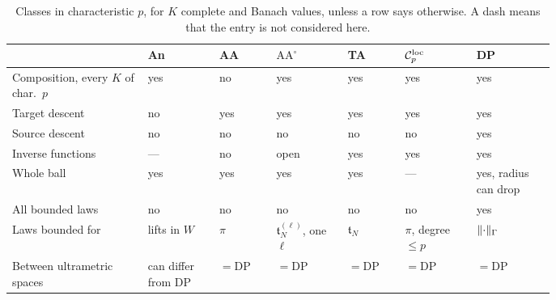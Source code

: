 \begin{table}[htbp]
\small
\caption{Classes in characteristic $p$, for $K$ complete and Banach values, unless a row says otherwise. A dash means that the entry is not considered here.}\label{dp:tab:classes}
\begin{tabular}{@{}p{0.19\linewidth}p{0.1\linewidth}p{0.085\linewidth}p{0.105\linewidth}p{0.085\linewidth}p{0.105\linewidth}p{0.11\linewidth}@{}}
 & An & AA & $\mathrm{AA}^\circ$ & TA & $\mathcal{C}_p^{\rm loc}$ & DP\\
\hline
Composition, every $K$ of char.\ $p$ & yes & no & yes & yes & yes & yes\\
Target descent & no & yes & yes & yes & yes & yes\\
Source descent & no & no & no & no & no & yes\\
Inverse functions & --- & no & open & yes & yes & yes\\
Whole ball & yes & yes & yes & yes & --- & yes, radius can drop\\
All bounded laws & no & no & no & no & no & yes\\
Laws bounded for & lifts in $W$ & $\pi$ & $\mathfrak t^{(\ell)}_N$, one $\ell$ & $\mathfrak t_N$ & $\pi$, degree $\le p$ & $\lVert \cdot\rVert_\Gamma$\\
Between ultrametric spaces & can differ from DP & $=\mathrm{DP}$ & $=\mathrm{DP}$ & $=\mathrm{DP}$ & $=\mathrm{DP}$ & $=\mathrm{DP}$\\
\end{tabular}
\end{table}

